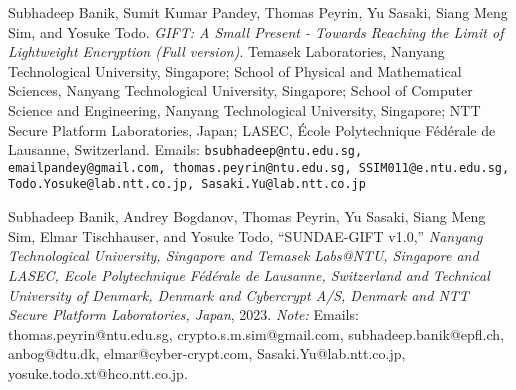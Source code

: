 \begin{thebibliography}{9}

Subhadeep Banik, Sumit Kumar Pandey, Thomas Peyrin, Yu Sasaki, Siang Meng Sim, and Yosuke Todo.
\textit{GIFT: A Small Present - Towards Reaching the Limit of Lightweight Encryption (Full version)}.
Temasek Laboratories, Nanyang Technological University, Singapore; School of Physical and Mathematical Sciences, Nanyang Technological University, Singapore; School of Computer Science and Engineering, Nanyang Technological University, Singapore; NTT Secure Platform Laboratories, Japan; LASEC, École Polytechnique Fédérale de Lausanne, Switzerland.
Emails: \texttt{bsubhadeep@ntu.edu.sg, emailpandey@gmail.com, thomas.peyrin@ntu.edu.sg, SSIM011@e.ntu.edu.sg, Todo.Yosuke@lab.ntt.co.jp, Sasaki.Yu@lab.ntt.co.jp}

Subhadeep Banik, Andrey Bogdanov, Thomas Peyrin, Yu Sasaki, Siang Meng Sim, Elmar Tischhauser, and Yosuke Todo,
``SUNDAE-GIFT v1.0,''
\emph{Nanyang Technological University, Singapore and Temasek Labs@NTU, Singapore and LASEC, Ecole Polytechnique Fédérale de Lausanne, Switzerland and Technical University of Denmark, Denmark and Cybercrypt A/S, Denmark and NTT Secure Platform Laboratories, Japan}, 2023.
\textit{Note:} Emails: thomas.peyrin@ntu.edu.sg, crypto.s.m.sim@gmail.com, subhadeep.banik@epfl.ch, anbog@dtu.dk, elmar@cyber-crypt.com, Sasaki.Yu@lab.ntt.co.jp, yosuke.todo.xt@hco.ntt.co.jp.
\end{thebibliography}
